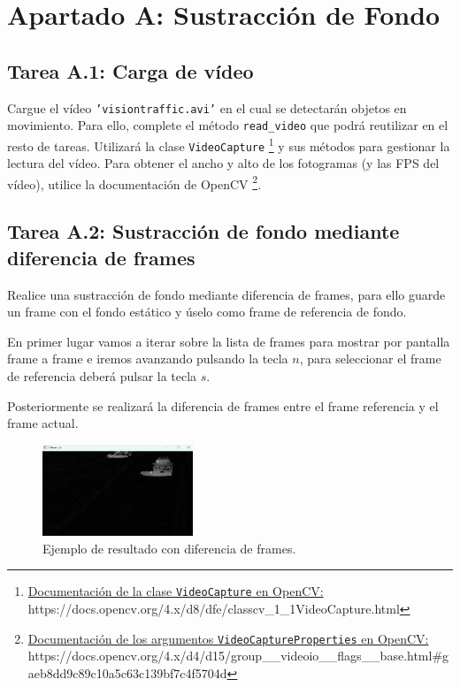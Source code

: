 \chapter{Apartado A: \textbf{Sustracción de Fondo}}
\label{chapter:tarea_a}


\section*{Tarea A.1: Carga de vídeo}
{}
Cargue el vídeo \texttt{'visiontraffic.avi'} en el cual se detectarán objetos en movimiento. Para ello, complete el método \texttt{read\_video} que podrá reutilizar en el resto de tareas. Utilizará la clase \texttt{VideoCapture} \footnote{ \href{https://docs.opencv.org/4.x/d8/dfe/classcv\_1\_1VideoCapture.html}{Documentación de la clase \texttt{VideoCapture} en OpenCV:} \\{https://docs.opencv.org/4.x/d8/dfe/classcv\_1\_1VideoCapture.html}} y sus métodos para gestionar la lectura del vídeo. Para obtener el ancho y alto de los fotogramas (y las FPS del vídeo), utilice la documentación de OpenCV \footnote{ \href{https://docs.opencv.org/4.x/d4/d15/group\_\_videoio\_\_flags\_\_base.html\#gaeb8dd9c89c10a5c63c139bf7c4f5704d}{Documentación de los argumentos \texttt{VideoCaptureProperties} en OpenCV:} \\{https://docs.opencv.org/4.x/d4/d15/group\_\_videoio\_\_flags\_\_base.html\#gaeb8dd9c89c10a5c63c139bf7c4f5704d}}.


\section*{Tarea A.2: Sustracción de fondo mediante diferencia de frames}
{}
Realice una sustracción de fondo mediante diferencia de frames, para ello guarde un frame con el fondo estático y úselo como frame de referencia de fondo.

En primer lugar vamos a iterar sobre la lista de frames para mostrar por pantalla frame a frame e iremos avanzando pulsando la tecla $n$, para seleccionar el frame de referencia deberá pulsar la tecla $s$.

Posteriormente se realizará la diferencia de frames entre el frame referencia y el frame actual.

\begin{figure}[H]
    \centering
    \includegraphics[width=0.4\textwidth]{Lab_4/template/figures/frame_difference.png}
    \caption{Ejemplo de resultado con diferencia de frames.}
    \label{fig:ejemplo_framediff}
\end{figure}

